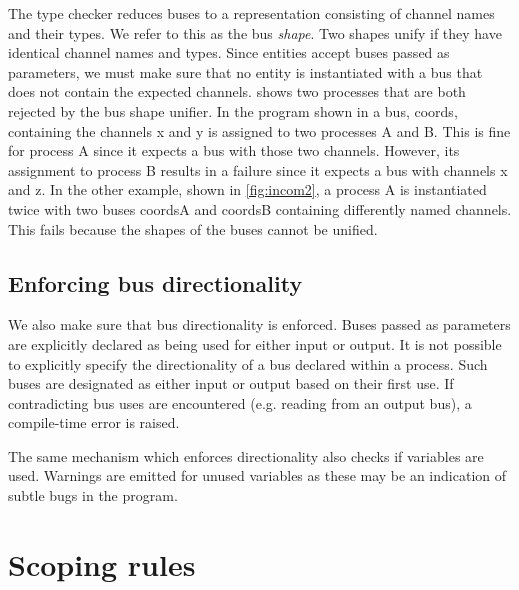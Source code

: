 The type checker reduces buses to a representation consisting of channel names
and their types. We refer to this as the bus {\itshape shape}. Two shapes unify
if they have identical channel names and types. Since entities accept buses
passed as parameters, we must make sure that no entity is instantiated with a
bus that does not contain the expected channels.  shows two
processes that are both rejected by the bus shape unifier. In the program shown
in  a bus, {\ttfamily coords}, containing the channels
{\ttfamily x} and {\ttfamily y} is assigned to two processes {\ttfamily A} and
{\ttfamily B}. This is fine for process {\ttfamily A} since it expects a bus
with those two channels. However, its assignment to process {\ttfamily B}
results in a failure since it expects a bus with channels {\ttfamily x} and
{\ttfamily z}. In the other example, shown in \cref{fig:incom2}, a process
{\ttfamily A} is instantiated twice with two buses {\ttfamily coordsA} and
{\ttfamily coordsB} containing differently named channels. This fails because
the shapes of the buses cannot be unified.


\subsection{Enforcing bus directionality}
We also make sure that bus directionality is enforced. Buses passed as
parameters are explicitly declared as being used for either input or output. It
is not possible to explicitly specify the directionality of a bus declared
within a process. Such buses are designated as either input or output based on
their first use. If contradicting bus uses are encountered (e.g. reading from an
output bus), a compile-time error is raised.

The same mechanism which enforces directionality also checks if variables are
used. Warnings are emitted for unused variables as these may be an indication of
subtle bugs in the program.

\section{Scoping rules}

